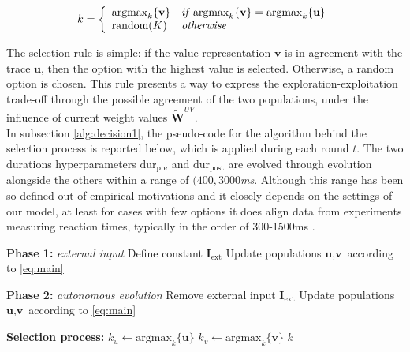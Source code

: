 \begin{equation*}
    k =
    \left\{
        \begin{array}{ll}
            \text{argmax}_{k}\{\textbf{v}\} & \text{\textit{if}}\; \text{argmax}_{k} \{\textbf{v}\} = \text{argmax}_{k} \{\textbf{u}\} \\
            \text{random}(K) & \text{\textit{otherwise}}
        \end{array}
    \right.
\end{equation*}

\noindent The selection rule is simple: if the value representation $\textbf{v}$ is in agreement with the trace $\textbf{u}$, then the option with the highest value is selected. Otherwise, a random option is chosen.
This rule presents a way to express the exploration-exploitation trade-off through the possible agreement of the two populations, under the influence of current weight values $\widetilde{\textbf{W}}^{UV}$. \\ In subsection \ref{alg:decision1}, the pseudo-code for the algorithm behind the selection process is reported below, which is applied during each round $t$.
The two durations hyperparameters $\text{dur}_{\text{pre}}$ and $\text{dur}_{\text{post}}$ are evolved through evolution alongside the others within a range of $(400, 3000$\textit{ms}.
Although this range has been so defined out of empirical motivations and it closely depends on the settings of our model, at least for cases with few options it does align data from experiments measuring reaction times, typically in the order of 300-1500ms \cite{churchlandDecisionmakingMultipleAlternatives2008, drugowitschOptimalMultisensoryDecisionmaking2014}.

\begin{algorithm}[ht]
\caption{Two-phases option selection process}
\label{alg:decision}
\SetAlgoLined
{}


\textbf{Phase 1:} \textit{external input} 
Define constant $\textbf{I}_{\text{ext}}$\;
Update populations $\textbf{u}, \textbf{v}$ according to \ref{eq:main}\;

\textbf{Phase 2:} \textit{autonomous evolution} 
Remove external input $\textbf{I}_{\text{ext}}$\;
Update populations $\textbf{u}, \textbf{v}$ according to \ref{eq:main}\;

\textbf{Selection process:}\;
$k_{u} \gets \text{argmax}_{k}\{\textbf{u}\}$\;
$k_{v} \gets \text{argmax}_{k}\{\textbf{v}\}$\;
\Return $k$

\end{algorithm}\label{alg:decision1}

